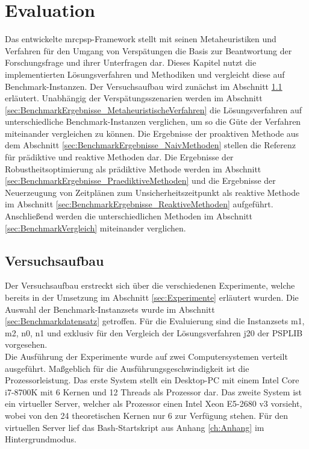 \chapter{Evaluation} \label{ch:Evaluation}

Das entwickelte \ac{mrcpsp}-Framework stellt mit seinen Metaheuristiken und Verfahren für den Umgang von Verspätungen die Basis zur Beantwortung der Forschungsfrage und ihrer Unterfragen dar. Dieses Kapitel nutzt die implementierten Lösungsverfahren und Methodiken und vergleicht diese auf Benchmark-Instanzen. Der Versuchsaufbau wird zunächst im Abschnitt \ref{sec:Versuchsaufbau} erläutert. Unabhängig der Verspätungsszenarien werden im Abschnitt \ref{sec:BenchmarkErgebnisse_MetaheuristischeVerfahren} die Lösungsverfahren auf unterschiedliche Benchmark-Instanzen verglichen, um so die Güte der Verfahren miteinander vergleichen zu können. Die Ergebnisse der proaktiven Methode aus dem Abschnitt \ref{sec:BenchmarkErgebnisse_NaivMethoden} stellen die Referenz für prädiktive und reaktive Methoden dar. Die Ergebnisse der Robustheitsoptimierung als prädiktive Methode werden im Abschnitt \ref{sec:BenchmarkErgebnisse_PraediktiveMethoden} und die Ergebnisse der Neuerzeugung von Zeitplänen zum Unsicherheitszeitpunkt als reaktive Methode im Abschnitt \ref{sec:BenchmarkErgebnisse_ReaktiveMethoden} aufgeführt. Anschließend werden die unterschiedlichen Methoden im Abschnitt \ref{sec:BenchmarkVergleich} miteinander verglichen. 


\section{Versuchsaufbau} \label{sec:Versuchsaufbau}

Der Versuchsaufbau erstreckt sich über die verschiedenen Experimente, welche bereits in der Umsetzung im Abschnitt \ref{sec:Experimente} erläutert wurden. Die Auswahl der Benchmark-Instanzsets wurde im Abschnitt \ref{sec:Benchmarkdatensatz} getroffen. Für die Evaluierung sind die Instanzsets m1, m2, n0, n1 und exklusiv für den Vergleich der Lösungsverfahren j20 der PSPLIB vorgesehen. \\

Die Ausführung der Experimente wurde auf zwei Computersystemen verteilt ausgeführt. Maßgeblich für die Ausführungsgeschwindigkeit ist die Prozessorleistung. Das erste System stellt ein Desktop-PC mit einem Intel\textsuperscript{\textregistered} Core\texttrademark \, i7-8700K mit 6 Kernen und 12 Threads als Prozessor dar. Das zweite System ist ein virtueller Server, welcher als Prozessor einen Intel\textsuperscript{\textregistered} Xeon\textsuperscript{\textregistered} E5-2680 v3 vorsieht, wobei von den 24 theoretischen Kernen nur 6 zur Verfügung stehen. Für den virtuellen Server lief das Bash-Startskript aus Anhang \ref{ch:Anhang} im Hintergrundmodus. 

